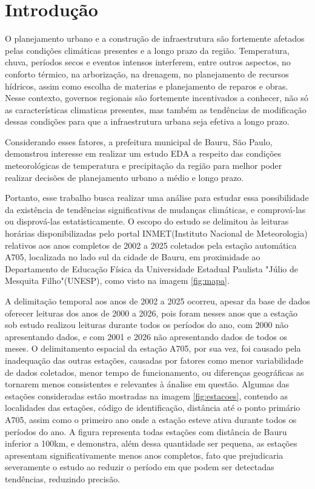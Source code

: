 \documentclass[pdflatex,sn-mathphys-num]{sn-jnl}%
\theoremstyle{thmstyleone}%
\theoremstyle{thmstyletwo}%
\theoremstyle{thmstylethree}%
\begin{document}
\newpage
\renewcommand*\contentsname{Sumário}
\tableofcontents
\newpage

\section{Introdução}\label{sec1}

O planejamento urbano e a construção de infraestrutura são fortemente afetados pelas condições climáticas presentes e a longo prazo da região.  Temperatura, chuva, períodos secos e eventos intensos interferem, entre outros aspectos, no conforto térmico, na arborização, na drenagem, no planejamento de recursos hídricos, assim como escolha de materias e planejamento de reparos e obras. Nesse contexto, governos regionais são fortemente incentivados a conhecer, não só as características climaticas presentes, mas também as tendências de modificação dessas condições para que a infraestrutura urbana seja efetiva a longo prazo.

Considerando esses fatores, a prefeitura municipal de Bauru, São Paulo, demonstrou interesse em realizar um estudo EDA a respeito das condições meteorológicas de temperatura e precipitação da região para melhor poder realizar decisões de planejamento urbano a médio e longo prazo.

Portanto, esse trabalho busca realizar uma análise para estudar essa possibilidade da existência de tendências significativas de mudanças climáticas, e comprová-las ou disprová-las estatisticamente. O escopo do estudo se delimitou às leituras horárias disponibilizadas pelo portal INMET(Instituto Nacional de Meteorologia)\cite{bib1} relativos aos anos completos de 2002 a 2025 coletados pela estação automática A705, localizada no lado sul da cidade de Bauru, em proximidade ao Departamento de Educação Física da Universidade Estadual Paulista "Júlio de Mesquita Filho"(UNESP), como visto na imagem \ref{fig:mapa}.

A delimitação temporal aos anos de 2002 a 2025 ocorreu, apesar da base de dados oferecer leituras dos anos de 2000 a 2026, pois foram nesses anos que a estação sob estudo realizou leituras durante todos os períodos do ano, com 2000 não apresentando dados, e com 2001 e 2026 não apresentando  dados de todos os meses. O delimitamento espacial da estação A705, por sua vez, foi causado pela inadequação das outras estações, causadas por fatores como menor variabilidade de dados coletados, menor tempo de funcionamento, ou diferenças geográficas as tornarem menos consistentes e relevantes à ánalise em questão. 
Algumas das estações consideradas estão mostradas na imagem \ref{fig:estacoes}, contendo as localidades das estações, código de identificação, distância até o ponto primário A705, assim como o primeiro ano onde a estação esteve ativa durante todos os períodos do ano. A figura representa todas estações\cite{bib2} com distância de Bauru inferior a 100km, e demonstra, além dessa quantidade ser pequena, as estações apresentam significativamente menos anos completos, fato que prejudicaria severamente o estudo ao reduzir o período em que podem ser detectadas tendências, reduzindo precisão.
\end{document}
